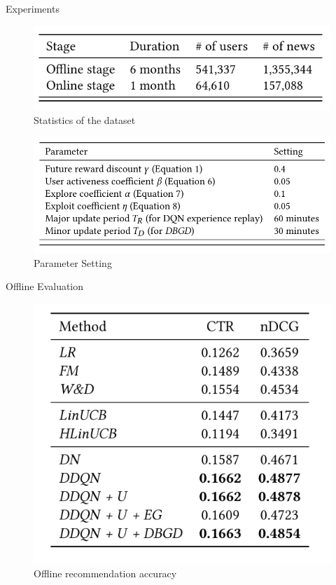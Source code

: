 \begin{frame}{Experiments}
\begin{figure}
    \centering
    \includegraphics[scale=0.5]{PPT/DeepinScreenshot_select-area_20200519133923.png}
    \caption{Statistics of the dataset}
    \label{fig:dataset}
\end{figure}
\begin{figure}
    \centering
    \includegraphics[scale=0.4]{PPT/DeepinScreenshot_select-area_20200519133941.png}
    \caption{Parameter Setting}
    \label{fig:parameter}
\end{figure}
\end{frame}


\begin{frame}{Offline Evaluation}
\begin{figure}
    \centering
    \includegraphics[scale=0.5]{PPT/DeepinScreenshot_select-area_20200519134511.png}
    \caption{Offline recommendation accuracy}
    \label{fig:offline_acc}
\end{figure}
\end{frame}


